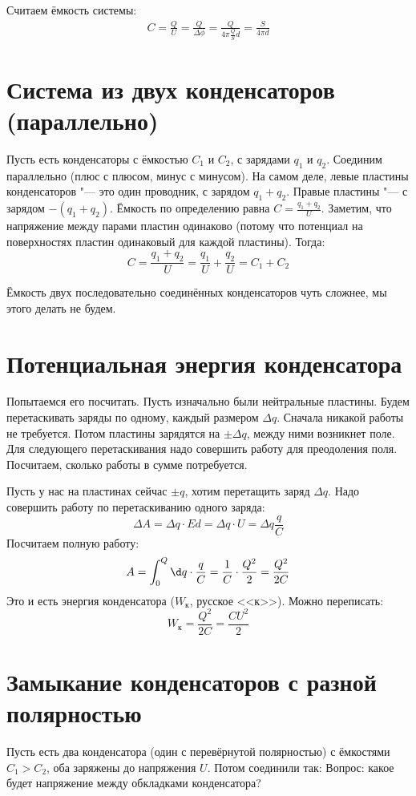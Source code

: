 	Считаем ёмкость системы:
	\begin{gather*}
	C = \frac Q U = \frac Q {\Delta \phi} = \frac Q {4 \pi \frac{Q}{S} d} = \frac{S}{4\pi d}
	\end{gather*}

\section{Система из двух конденсаторов (параллельно)}
	Пусть есть конденсаторы с ёмкостью $C_1$ и $C_2$, с зарядами $q_1$ и $q_2$.
	Соединим параллельно (плюс с плюсом, минус с минусом).
	На самом деле, левые пластины конденсаторов "--- это один проводник, с зарядом $q_1+q_2$.
	Правые пластины "--- с зарядом $-(q_1+q_2)$.
	Ёмкость по определению равна $C = \frac{q_1+q_2}{U}$.
	Заметим, что напряжение между парами пластин одинаково
	(потому что потенциал на поверхностях пластин одинаковый для каждой пластины).
	Тогда:
	\[ C = \frac{q_1 + q_2}{U} = \frac{q_1}{U} + \frac{q_2}{U} = C_1+C_2\]
	\begin{Rem}
	Ёмкость двух последовательно соединённых конденсаторов чуть сложнее, мы этого делать не будем.
	\end{Rem}

\section{Потенциальная энергия конденсатора}
	Попытаемся его посчитать.
	Пусть изначально были нейтральные пластины.
	Будем перетаскивать заряды по одному, каждый размером $\Delta q$.
	Сначала никакой работы не требуется.
	Потом пластины зарядятся на $\pm \Delta q$, между ними возникнет поле.
	Для следующего перетаскивания надо совершить работу для преодоления поля.
	Посчитаем, сколько работы в сумме потребуется.

	Пусть у нас на пластинах сейчас $\pm q$, хотим перетащить заряд $\Delta q$.
	Надо совершить работу по перетаскиванию одного заряда:
	\[\Delta A=\Delta q \cdot E d = \Delta q \cdot U = \Delta q \frac q C\]
	Посчитаем полную работу:
	\[A = \int_0^Q \d q \cdot \frac q C = \frac 1C \cdot \frac{Q^2}{2} = \frac{Q^2}{2C}\]
	Это и есть энергия конденсатора ($W_к$, русское <<к>>).
	Можно переписать:
	\[W_к = \frac{Q^2}{2C} = \frac{CU^2}{2}\]

\section{Замыкание конденсаторов с разной полярностью}
	Пусть есть два конденсатора (один с перевёрнутой полярностью) с ёмкостями $C_1 > C_2$, оба заряжены до напряжения $U$.
	Потом соединили так:
		Вопрос: какое будет напряжение между обкладками конденсатора?

